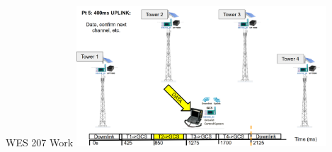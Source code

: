 





\begin{frame}{WES 207 Work}
    \centering
    \includegraphics[height=0.7\textheight,width=0.7\textwidth,keepaspectratio]{images/rtt/lora-work.png}
\end{frame}

